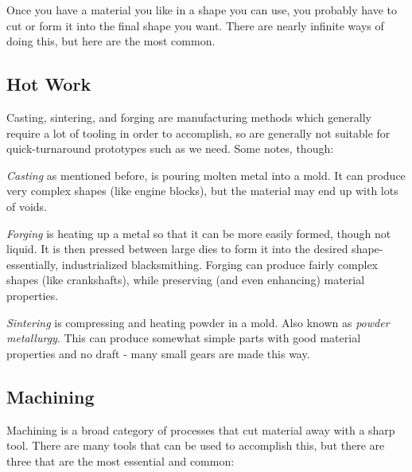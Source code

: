  Once you have a material you like in a shape you can use, you probably have to cut or form it into the final shape you want. There are nearly infinite ways of doing this, but here are the most common.
 
 \subsection{Hot Work}
 
 Casting, sintering, and forging are manufacturing methods which generally require a lot of tooling in order to accomplish, so are generally not suitable for quick-turnaround prototypes such as we need. Some notes, though:
 
 \begin{asparaitem}
 	\item \textit{Casting} as mentioned before, is pouring molten metal into a mold. It can produce very complex shapes (like engine blocks), but the material may end up with lots of voids.
 	\item \textit{Forging} is heating up a metal so that it can be more easily formed, though not liquid. It is then pressed between large dies to form it into the desired shape- essentially, industrialized blacksmithing. Forging can produce fairly complex shapes (like crankshafts), while preserving (and even enhancing) material properties.
 	\item \textit{Sintering} is compressing and heating powder in a mold. Also known as \textit{powder metallurgy}. This can produce somewhat simple parts with good material properties and no draft - many small gears are made this way.
 \end{asparaitem}
 
 \subsection{Machining}
 Machining is a broad category of processes that cut material away with a sharp tool. There are many tools that can be used to accomplish this, but there are three that are the most essential and common:
 
